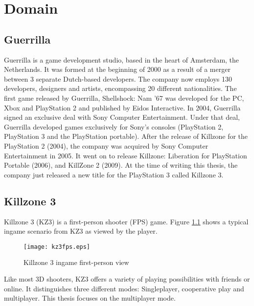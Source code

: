 \chapter{Domain} %
\label{Chapter4}
\section{Guerrilla}
Guerrilla is a game development studio, based in the heart of Amsterdam, the
Netherlands. It was formed at the beginning of 2000 as a result of a merger
between 3 separate Dutch-based developers. The company now employs 130
developers, designers and artists, encompassing 20 different nationalities. The
first game released by Guerrilla, Shellshock: Nam '67 was developed for the PC,
Xbox and PlayStation 2 and published by Eidos Interactive. In 2004, Guerrilla
signed an exclusive deal with Sony Computer Entertainment. Under that deal,
Guerrilla developed games exclusively for Sony's consoles (PlayStation 2,
PlayStation 3 and the PlayStation portable). After the release of Killzone for
the PlayStation 2 (2004), the company was acquired by Sony Computer
Entertainment in 2005. It went on to release Killzone: Liberation for
PlayStation Portable (2006), and KillZone 2 (2009). At the time of writing this
thesis, the company just released a new title for the PlayStation 3 called
Killzone 3.

\section{Killzone 3}
Killzone 3 (KZ3) is a first-person shooter (FPS) game. Figure
\ref{fig:killzone} shows a typical ingame scenario from KZ3 as viewed by the
player.
\begin{figure}[!ht]
\centering
\texttt{[image: kz3fps.eps]}
\caption{Killzone 3 ingame first-person view}
\label{fig:killzone}
\end{figure}
Like most 3D shooters, KZ3 offers a variety of playing possibilities with
friends or online. It distinguishes three different modes: Singleplayer,
cooperative play and multiplayer. This thesis focuses on the multiplayer mode.

